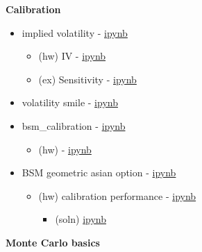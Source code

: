 \documentclass[11pt]{article}
\providecommand{\tightlist}{%
      \setlength{\itemsep}{0pt}\setlength{\parskip}{0pt}}
\begin{document}
    \textbf{Calibration}

\begin{itemize}
\tightlist
\item
  implied volatility -
  \href{https://nbviewer.jupyter.org/github/songqsh/18ma573pub/blob/master/src/implied_vol_v01.ipynb}{ipynb}

  \begin{itemize}
  \tightlist
  \item
    (hw) IV -
    \href{https://nbviewer.jupyter.org/github/songqsh/18ma573pub/blob/master/src/hw_implied_vol.ipynb}{ipynb}
  \item
    (ex) Sensitivity - \href{src/ex_montonicity.ipynb}{ipynb}
  \end{itemize}
\item
  volatility smile - \href{src/vol_smile_v01.ipynb}{ipynb}
\item
  bsm\_calibration - \href{src/bsm_calibration_v01.ipynb}{ipynb}

  \begin{itemize}
  \tightlist
  \item
    (hw) -
    \href{https://nbviewer.jupyter.org/github/songqsh/18ma573pub/blob/master/src/hw_bsm_calibration.ipynb}{ipynb}
  \end{itemize}
\item
  BSM geometric asian option -
  \href{src/bsm_geometric_asian_option.ipynb}{ipynb}

  \begin{itemize}
  \tightlist
  \item
    (hw) calibration performance -
    \href{src/hw_bsm_geometric_asian_option.ipynb}{ipynb}

    \begin{itemize}
    \tightlist
    \item
      (soln) \href{src/calibration_performance_v01.ipynb}{ipynb}
    \end{itemize}
  \end{itemize}
\end{itemize}

    \textbf{Monte Carlo basics}
\end{document}

